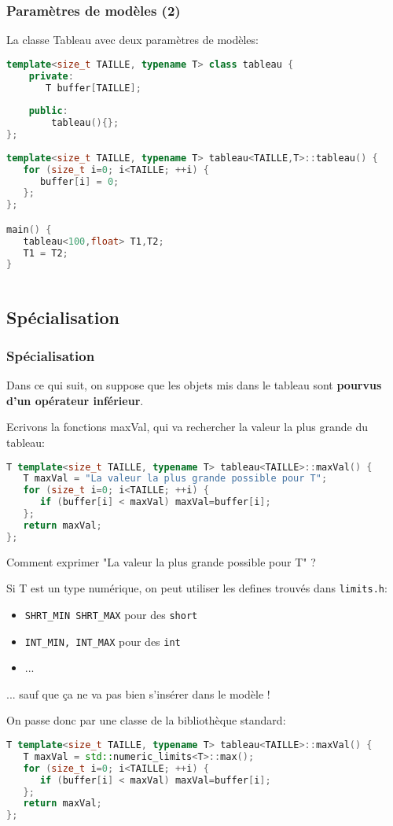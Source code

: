 \documentclass{beamer}
\begin{document}
\begin{frame}[fragile=singleslide,shrink=20]
\frametitle {Paramètres de modèles (2)}

La classe Tableau avec deux paramètres de modèles:
\begin{lstlisting}[language=c++]
template<size_t TAILLE, typename T> class tableau {
    private:
       T buffer[TAILLE];
    
    public:
        tableau(){};
};
    
template<size_t TAILLE, typename T> tableau<TAILLE,T>::tableau() {
   for (size_t i=0; i<TAILLE; ++i) { 
      buffer[i] = 0; 
   };
};

main() {
   tableau<100,float> T1,T2;
   T1 = T2;
}
   
\end{lstlisting}
\end{frame}

\subsection{Spécialisation}

\begin{frame}[fragile=singleslide,shrink=20]
\frametitle {Spécialisation}

Dans ce qui suit, on  suppose que les objets mis dans le tableau sont \textbf{pourvus d'un opérateur inférieur}.

Ecrivons la fonctions maxVal, qui va rechercher la valeur la plus grande du tableau:

\begin{lstlisting}[language=c++]
T template<size_t TAILLE, typename T> tableau<TAILLE>::maxVal() {
   T maxVal = "La valeur la plus grande possible pour T";
   for (size_t i=0; i<TAILLE; ++i) {
      if (buffer[i] < maxVal) maxVal=buffer[i];
   };
   return maxVal;
};
\end{lstlisting}

Comment exprimer "La valeur la plus grande possible pour T" ?

Si T est un type numérique, on peut utiliser les defines trouvés dans \texttt{limits.h}:

\begin{itemize}
\item{ \texttt{SHRT\_MIN SHRT\_MAX} pour des \texttt{short}}
\item{ \texttt{INT\_MIN, INT\_MAX} pour des \texttt{int}}
\item{...}
\end{itemize}
... sauf que ça ne va pas bien s'insérer dans le modèle !

On passe donc par une classe de la bibliothèque standard:
\begin{lstlisting}[language=c++]
T template<size_t TAILLE, typename T> tableau<TAILLE>::maxVal() {
   T maxVal = std::numeric_limits<T>::max();
   for (size_t i=0; i<TAILLE; ++i) {
      if (buffer[i] < maxVal) maxVal=buffer[i];
   };
   return maxVal;
};
\end{lstlisting}
\end{frame}
\end{document}
